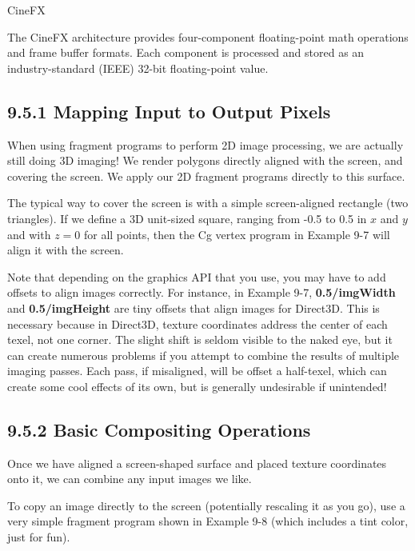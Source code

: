 \documentclass[../main.tex]{subfiles}
\begin{document}
\begin{framed}
CineFX

The CineFX architecture provides four-component floating-point math operations and frame buffer formats. Each component is processed and stored as an industry-standard (IEEE) 32-bit floating-point value.
\end{framed}

\subsection{9.5.1 Mapping Input to Output Pixels}

When using fragment programs to perform 2D image processing, we are actually still doing 3D imaging! We render polygons directly aligned with the screen, and covering the screen. We apply our 2D fragment programs directly to this surface.

The typical way to cover the screen is with a simple screen-aligned rectangle (two triangles). If we define a 3D unit-sized square, ranging from -0.5 to 0.5 in $x$ and $y$ and with $z = 0$ for all points, then the Cg vertex program in Example 9-7 will align it with the screen.

Note that depending on the graphics API that you use, you may have to add offsets to align images correctly. For instance, in Example 9-7, \textbf{0.5/imgWidth} and \textbf{0.5/imgHeight} are tiny offsets that align images for Direct3D. This is necessary because in Direct3D, texture coordinates address the center of each texel, not one corner. The slight shift is seldom visible to the naked eye, but it can create numerous problems if you attempt to combine the results of multiple imaging passes. Each pass, if misaligned, will be offset a half-texel, which can create some cool effects of its own, but is generally undesirable if unintended!

\subsection{9.5.2 Basic Compositing Operations}

Once we have aligned a screen-shaped surface and placed texture coordinates onto it, we can combine any input images we like.

To copy an image directly to the screen (potentially rescaling it as you go), use a very simple fragment program shown in Example 9-8 (which includes a tint color, just for fun).
\end{document}
